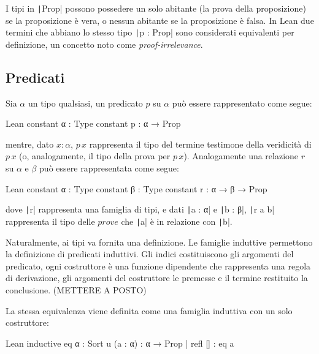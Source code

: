 I tipi in \texttt|Prop| possono possedere un solo abitante (la prova della proposizione) se la proposizione è vera, o nessun abitante se la proposizione è falsa. In Lean due termini che abbiano lo stesso tipo \texttt|p : Prop| sono considerati equivalenti per definizione, un concetto noto come \emph{proof-irrelevance}.

\subsection{Predicati}
Sia $\alpha$ un tipo qualsiasi, un predicato $p$ su $\alpha$ può essere rappresentato come segue:
\begin{code}{Lean}
constant α : Type
constant p : α → Prop
\end{code}
mentre, dato $x : \alpha$, $p\,x$ rappresenta il tipo del termine testimone della veridicità di $p\,x$ (o, analogamente, il tipo della prova per $p\,x$). 
Analogamente una relazione $r$ su $\alpha$ e $\beta$ può essere rappresentata come segue:
\begin{code}{Lean}
constant α : Type
constant β : Type
constant r : α → β → Prop
\end{code}
dove \texttt|r| rappresenta una famiglia di tipi, e dati  \texttt|a : α| e \texttt|b : β|, \texttt|r a b| rappresenta il tipo delle $prove$ che \texttt|a| è in relazione con \texttt|b|.

Naturalmente, ai tipi va fornita una definizione. Le famiglie induttive permettono la definizione di predicati induttivi. Gli indici costituiscono gli argomenti del predicato, ogni costruttore è una funzione dipendente che rappresenta una regola di derivazione, gli argomenti del costruttore le premesse e il termine restituito la conclusione.  (METTERE A POSTO)

La stessa equivalenza viene definita come una famiglia induttiva con un solo costruttore:
\begin{code}{Lean}
inductive eq {α : Sort u} (a : α) : α → Prop
| refl [] : eq a
\end{code}

